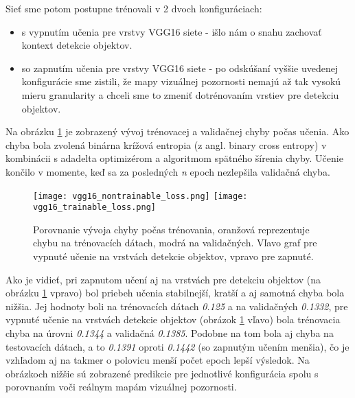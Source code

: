 Sieť sme potom postupne trénovali v 2 dvoch konfiguráciach:
\begin{itemize}
	\item s vypnutím učenia pre vrstvy VGG16 siete - išlo nám o snahu zachovať kontext detekcie objektov.
	\item so zapnutím učenia pre vrstvy VGG16 siete - po odskúšaní vyššie uvedenej konfigurácie sme zistili, že mapy vizuálnej pozornosti nemajú až tak vysokú mieru granularity a chceli sme to zmeniť dotrénovaním vrstiev pre detekciu objektov. 
\end{itemize}

Na obrázku \ref{vgg16_loss_trainable_vs_nontrainable} je zobrazený vývoj  trénovacej a validačnej chyby počas učenia. Ako chyba bola zvolená binárna krížová entropia (z angl. binary cross entropy) v kombinácii s adadelta optimizérom a algoritmom spätného šírenia chyby. Učenie končilo v momente, keď sa za posledných \textit{n} epoch nezlepšila validačná chyba.

\begin{figure}[H]
	\begin{center}
		\texttt{[image: vgg16\_nontrainable\_loss.png]}
		\texttt{[image: vgg16\_trainable\_loss.png]}
		\caption[Porovnanie vývoja chyby predikcie počas trénovania kombinácie autoenkóderu s VGG16 sieťou]{
			Porovnanie vývoja chyby počas trénovania, oranžová reprezentuje chybu na trénovacích dátach, modrá na validačných. Vľavo graf pre vypnuté učenie na vrstvách detekcie objektov, vpravo pre zapnuté.
		}\label{vgg16_loss_trainable_vs_nontrainable}
	\end{center}
\end{figure}

Ako je vidieť, pri zapnutom učení aj na vrstvách pre detekciu objektov (na obrázku \ref{vgg16_loss_trainable_vs_nontrainable} vpravo) bol priebeh učenia stabilnejší, kratší a aj samotná chyba bola nižšia. Jej hodnoty boli na trénovacích dátach \textit{0.125} a na validačných \textit{0.1332}, pre vypnuté učenie na vrstvách detekcie objektov (obrázok \ref{vgg16_loss_trainable_vs_nontrainable} vľavo) bola trénovacia chyba na úrovni \textit{0.1344} a validačná \textit{0.1385}. Podobne na tom bola aj chyba na testovacích dátach, a to \textit{0.1391} oproti \textit{0.1442} (so zapnutým učením menšia), čo je vzhľadom aj na takmer o polovicu menší počet epoch lepší výsledok. Na obrázkoch nižšie sú zobrazené predikcie pre jednotlivé konfigurácia spolu s porovnaním voči reálnym mapám vizuálnej pozornosti. 

